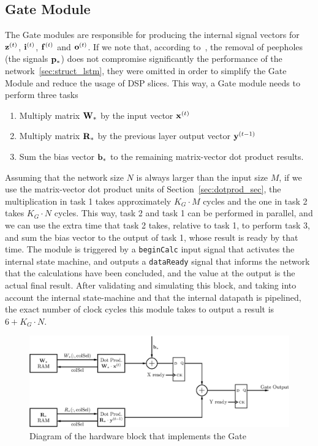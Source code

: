 \subsection{Gate Module}\label{sec:gatemod}
The Gate modules are responsible for producing the internal signal vectors for $\mathbf{z}^{(t)}$, $\mathbf{i}^{(t)}$, $\mathbf{f}^{(t)}$ and $\mathbf{o}^{(t)}$. If we note that, according
to~\cite{Greff15}, the removal of peepholes (the signals $\mathbf{p}_*$) does not compromise significantly the performance of the network~\ref{sec:struct_lstm}, they were omitted
in order to simplify the Gate Module and reduce the usage of DSP slices. This way, a Gate module needs to perform three tasks

\begin{enumerate}
    \item Multiply matrix $\mathbf{W}_*$ by the input vector $\mathbf{x}^{(t)}$
    \item Multiply matrix $\mathbf{R}_*$ by the previous layer output vector $\mathbf{y}^{(t-1)}$
    \item Sum the bias vector $\mathbf{b}_*$ to the remaining matrix-vector dot product results.
\end{enumerate}
Assuming that the network size $N$ is always larger than the input size $M$, if we use the matrix-vector dot product units of Section~\ref{sec:dotprod_sec}, the multiplication in task 1 takes approximately $K_G\cdot M$ cycles and the one in task 2 takes $K_G\cdot N$ cycles. This way, task 2 and task 1 can be performed in parallel, and we can use the extra time that task 2 takes, relative to task 1,  to perform task 3, and sum the bias vector to the output of task 1, whose result is ready by that time. The module is triggered by a \verb+beginCalc+ input signal that activates the internal state machine, and outputs a \verb+dataReady+ signal that informs the network that the calculations have been concluded, and the value at the output is the actual final result.
After validating and simulating this block, and taking into account the internal state-machine and that the internal datapath is pipelined, the exact number of clock cycles this
module takes to output a result is $6+K_G\cdot N$.

\begin{figure}
    \centering
    \includegraphics[width=\linewidth]{figures/gate.eps}
    \caption[Diagram of the hardware block that implements the Gate]{Diagram of the hardware block that implements the Gate}
    \label{fig:gate}
\end{figure}

